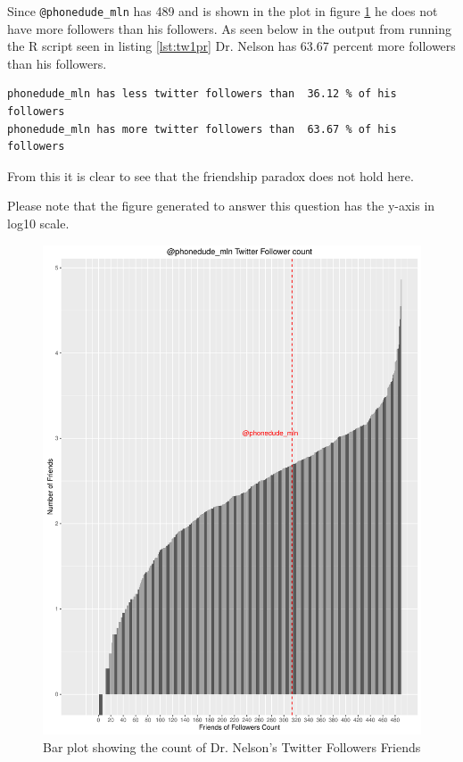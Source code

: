 \documentclass[letterpaper,10pt]{article}
\begin{document}
Since \verb+@phonedude_mln+ has 489 and is shown in the plot in figure \ref{fig:twfp} he does not have more followers than his followers.  As seen below in the output from running the R script seen in listing \ref{lst:tw1pr} Dr. Nelson has 63.67 percent more followers than his followers. 

\begin{lstlisting}[frame=single]
phonedude_mln has less twitter followers than  36.12 % of his followers
phonedude_mln has more twitter followers than  63.67 % of his followers
\end{lstlisting}

From this it is clear to see that the friendship paradox does not hold here.

Please note that the figure generated to answer this question has the y-axis in log10 scale.
\newpage
\begin{figure}
\includegraphics[scale=0.6]{mlnTwitterFollowerParadox.pdf}
\caption{Bar plot showing the count of Dr. Nelson's Twitter Followers Friends}
\label{fig:twfp}
\end{figure}
\newpage

\end{document}
